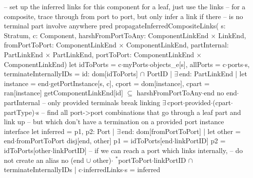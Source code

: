 -- set up the inferred links for this component for a leaf, just use the links
-- for a composite, trace through from port to port, but only infer a link if there
-- is no terminal part involve anywhere
pred propagateInferredCompositeLinks(
  s: Stratum,
  c: Component,  
  harshFromPortToAny:  ComponentLinkEnd$\,\times\,$LinkEnd,
  fromPortToPort:      ComponentLinkEnd$\,\times\,$ComponentLinkEnd,
  partInternal:        PartLinkEnd$\,\times\,$PartLinkEnd,
  portToPort:          ComponentLinkEnd$\,\times\,$ComponentLinkEnd)
{
  let
    idToPorts = c$\cdot$myPorts$\cdot$objects_e[s],
    allPorts = c$\cdot$ports$\cdot$s,
    terminateInternallyIDs =
    { id: dom[idToPorts] $\cap$ PortID |
      $\exists\,$end: PartLinkEnd |
      let instance = end$\cdot$getPortInstance[s, c],
        cport = dom[instance],
        cpart = ran[instance]
      {
        getComponentLinkEnd[id] $\subseteq$ harshFromPortToAny$\cdot$end
        no end$\cdot$partInternal
        -- only provided terminals break linking
        $\exists\,$cport$\cdot$provided$\cdot$(cpart$\cdot$partType)$\cdot$s
      }
    }
  {
    -- find all port->port combinations that go through a leaf part and link up
    -- but which don't have a termination on a provided port instance interface
    let inferred =
    { p1, p2: Port |
      $\exists\,$end: dom[fromPortToPort] | let other = end$\cdot$fromPortToPort
      {
        disj[end, other]
        p1 = idToPorts[end$\cdot$linkPortID]
        p2 = idToPorts[other$\cdot$linkPortID]
        -- if we can reach a port which links internally,
        -- do not create an alias
        no (end $\cup$ other)$\cdot$ $\!\!\!^\ast\!$portToPort$\cdot$linkPortID $\cap$ terminateInternallyIDs
      }
    } |
    c$\cdot$inferredLinks$\cdot$s = inferred
  }
}
